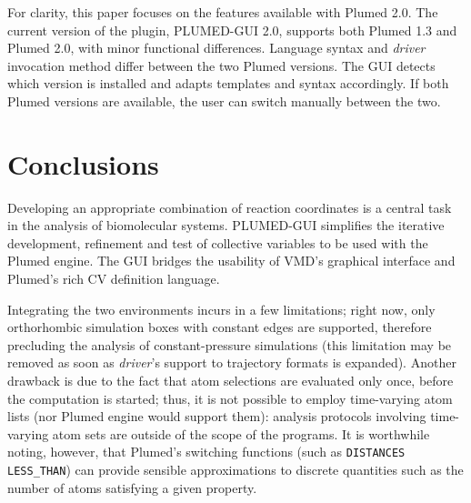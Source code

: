 \documentclass[preprint,review,11pt]{elsarticle}
\begin{document}
For clarity, this paper focuses on the features available with Plumed
2.0. The current version of the plugin, PLUMED-GUI 2.0, supports both
Plumed 1.3 and Plumed 2.0, with minor functional differences.
Language syntax and \emph{driver} invocation method differ between the
two Plumed versions.  The GUI detects which version is installed and
adapts templates and syntax accordingly.  If both Plumed versions are
available, the user can switch manually between the two.

















\section{Conclusions}

Developing an appropriate combination of reaction coordinates is a
central task in the analysis of biomolecular systems.  PLUMED-GUI
simplifies the iterative development, refinement and test of
collective variables to be used with the Plumed engine.  The GUI
bridges the usability of VMD's graphical interface and Plumed's rich
CV definition language.  

Integrating the two environments incurs in a few limitations; right
now, only orthorhombic simulation boxes with constant edges are
supported, therefore precluding the analysis of constant-pressure
simulations (this limitation may be removed as soon as \emph{driver}'s
support to trajectory formats is expanded). Another drawback is due to
the fact that atom selections are evaluated only once, before the
computation is started; thus, it is not possible to employ
time-varying atom lists (nor Plumed engine would support them):
analysis protocols involving time-varying atom sets are outside of the
scope of the programs. It is worthwhile noting, however, that Plumed's
switching functions (such as \texttt{DISTANCES LESS\_THAN}) can
provide sensible approximations to discrete quantities such as the
number of atoms satisfying a given property.
\end{document}
